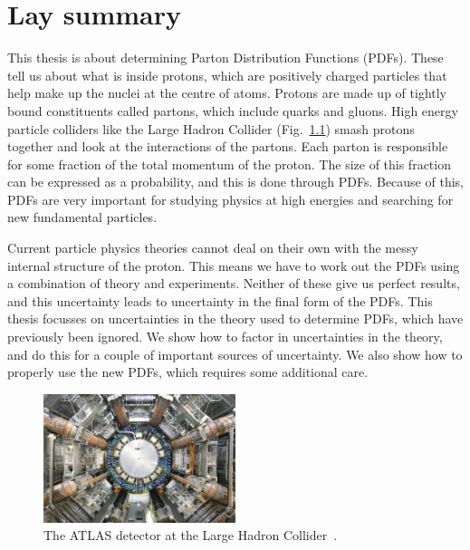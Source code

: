 \chapter{Lay summary}
This thesis is about determining Parton Distribution Functions (PDFs). These tell us about what is inside protons, which are positively charged particles that help make up the nuclei at the centre of atoms. Protons are made up of tightly bound constituents called partons, which include quarks and gluons. High energy particle colliders like the Large Hadron Collider (Fig.~\ref{fig:atlas}) smash protons together and look at the interactions of the partons. Each parton is responsible for some fraction of the total momentum of the proton. The size of this fraction can be expressed as a probability, and this is done through PDFs. Because of this, PDFs are very important for studying physics at high energies and searching for new fundamental particles. 

Current particle physics theories cannot deal on their own with the messy internal structure of the proton. This means we have to work out the PDFs using a combination of theory and experiments. Neither of these give us perfect results, and this uncertainty leads to uncertainty in the final form of the PDFs. This thesis focusses on uncertainties in the theory used to determine PDFs, which have previously been ignored. We show how to factor in uncertainties in the theory, and do this for a couple of important sources of uncertainty. We also show how to properly use the new PDFs, which requires some additional care.

\begin{figure}[H]
\centering
\includegraphics[width=0.5\textwidth]{atlas.jpeg}
\caption{The ATLAS detector at the Large Hadron Collider~\cite{atlas}.\label{fig:atlas}}
\end{figure}
